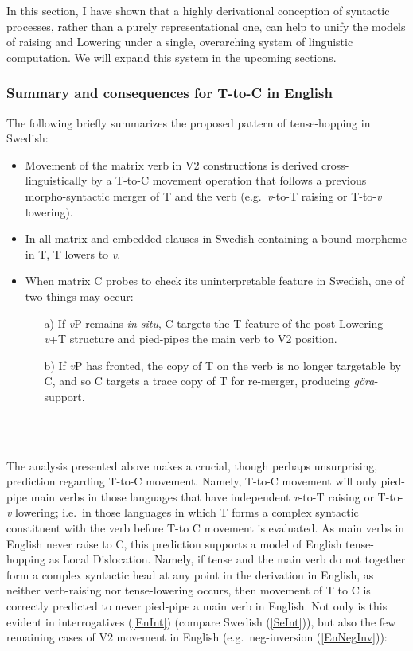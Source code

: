 In this section, I have shown that a highly derivational conception of syntactic processes, rather than a purely representational one, can help to unify the models of raising and Lowering under a single, overarching system of linguistic computation. We will expand this system in the upcoming sections.

\subsubsection{Summary and consequences for T-to-C in English}

\noindent
The following briefly summarizes the proposed pattern of tense-hopping in Swedish:

\singlespacing
\begin{minipage}{5in}
\begin{itemize}
\item Movement of the matrix verb in V2 constructions is derived cross-linguistically by a T-to-C movement operation that follows a previous morpho-syntactic merger of T and the verb (e.g.\ {\it v}-to-T raising or T-to-{\it v} lowering). 
\item In all matrix and embedded clauses in Swedish containing a bound morpheme in T, T lowers to {\it v}.
\item When matrix C\raisebox{-3pt}{\footnotesize{[-T]}} probes to check its uninterpretable feature in Swedish, one of two things may occur:
\begin{itemize}
\item[a)] If {\it v}P remains {\it in situ}, C targets the T-feature of the post-Lowering {\it v}+T structure and pied-pipes the main verb to V2 position.
\item[b)] If {\it v}P has fronted, the copy of T on the verb is no longer targetable by C, and so C targets a trace copy of T for re-merger, producing {\it g\"{o}ra}-support.
\end{itemize}

\end{itemize}
\end{minipage}\\\\
\onehalfspacing

The analysis presented above makes a crucial, though perhaps unsurprising, prediction regarding T-to-C movement. Namely, T-to-C movement will only pied-pipe main verbs in those languages that have independent \textit{v}-to-T raising or T-to-\textit{v} lowering; i.e.\ in those languages in which T forms a complex syntactic constituent with the verb before T-to C movement is evaluated. As main verbs in English never raise to C, this prediction supports a model of English tense-hopping as Local Dislocation. Namely, if tense and the main verb do not together form a complex syntactic head at any point in the derivation in English, as neither verb-raising nor tense-lowering occurs, then movement of T to C is correctly predicted to never pied-pipe a main verb in English. Not only is this evident in interrogatives (\ref{EnInt}) (compare Swedish (\ref{SeInt})), but also the few remaining cases of V2 movement in English (e.g.\ neg-inversion (\ref{EnNegInv})):

